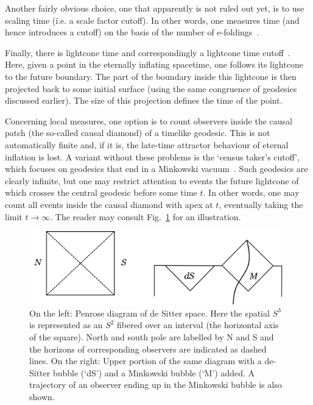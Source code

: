 \documentclass[12pt]{article}
\numberwithin{equation}{section}
\begin{document}
Another fairly obvious choice, one that apparently is not ruled out yet, is to use scaling time (i.e. a scale factor cutoff). In other words, one measures time (and hence introduces  a cutoff) on the basis of the number of e-foldings~\cite{Linde:1993nz}.

Finally, there is lightcone time and correspondingly a lightcone time cutoff~\cite{Garriga:2005av, Bousso:2009dm}. Here, given a point in the eternally inflating spacetime, one follows its lightcone to the future boundary. The part of the boundary inside this lightcone is then projected back to some initial surface (using the same congruence of geodesics discussed earlier). The size of this projection defines the time of the point.

Concerning local measures, one option is to count observers inside the causal patch (the so-called causal diamond) of a timelike geodesic. This is not automatically finite and, if it is, the late-time attractor behaviour of eternal inflation is lost. A variant without these problems is the `census taker's cutoff', which focuses on geodesics that end in a Minkowski vacuum~\cite{ctc, Susskind:2007pv}. Such geodesics are clearly infinite, but one may restrict attention to events the future lightcone of which crosses the central geodesic before some time $t$. In other words, one may count all events inside the causal diamond with apex at $t$, eventually taking the limit $t\to\infty$. The reader may consult Fig.~\ref{pdds} for an illustration.

\begin{figure}[ht]
\begin{center} 
\includegraphics[width=11cm]{pdds.png}
\caption{On the left: Penrose diagram of de Sitter space. Here the spatial $S^3$ is represented as an $S^2$ fibered over an interval (the horizontal axis of the square). North and south pole are labelled by N and S and the horizons of corresponding observers are indicated as dashed lines. On the right: Upper portion of the same diagram with a de-Sitter bubble (`dS') and a Minkowski bubble (`M') added. A trajectory of an observer ending up in the Minkowski bubble is also shown.}
\label{pdds} 
\end{center}
\end{figure}
\end{document}
